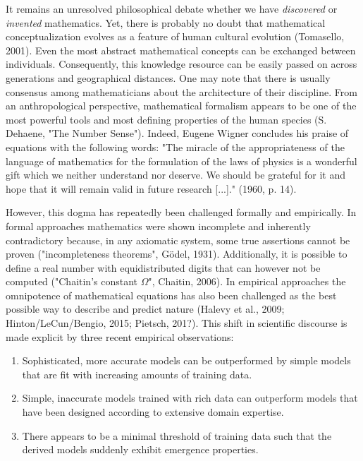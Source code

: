 \documentclass[authoryear,review,3p]{elsarticle}
\begin{document}
It remains an unresolved philosophical debate whether we have
\textit{discovered} or \textit{invented} mathematics.
Yet, there is probably no doubt
that mathematical conceptualization
evolves as a feature of human cultural evolution (Tomasello, 2001).
Even the most abstract mathematical concepts can
be exchanged between individuals. Consequently,
this knowledge resource can be easily passed
on across generations and geographical distances.
One may note that
there is usually consensus among mathematicians
about the architecture of their discipline.
From an anthropological perspective,
mathematical formalism
appears to be one of the most
powerful tools and most defining properties of the human species
(S. Dehaene, "The Number Sense").
Indeed,
Eugene Wigner concludes his praise of equations with the following words:
"The miracle of the appropriateness of the language of mathematics
for the formulation of the laws of physics is a wonderful gift
which we neither understand nor deserve. We should be grateful for
it and hope that it will remain valid in future research [...]."
(1960, p. 14).


However, this dogma has repeatedly been challenged formally
and empirically.
%
In formal approaches
mathematics were shown incomplete and inherently contradictory because,
in any axiomatic system, some true assertions cannot be proven
("incompleteness theorems", G\"odel, 1931).
Additionally,
it is possible to define a real number with equidistributed
digits that can however not be computed
("Chaitin's constant $\Omega$", Chaitin, 2006).
%
In empirical approaches
the omnipotence of mathematical equations has also been challenged
as the
best possible way to describe and predict nature
(Halevy et al., 2009; Hinton/LeCun/Bengio, 2015; Pietsch, 201?).
%
This shift in scientific discourse is made explicit by
three recent empirical observations:
\begin{enumerate}
  \item Sophisticated, more accurate models can be outperformed by
  simple models that are fit with increasing amounts of training data.
  \item Simple, inaccurate models trained with rich data can outperform
  models that have been designed according to
  extensive domain expertise.
  \item There appears to be a minimal threshold of training data
  such that the derived models suddenly exhibit emergence properties.
\end{enumerate}
\end{document}

